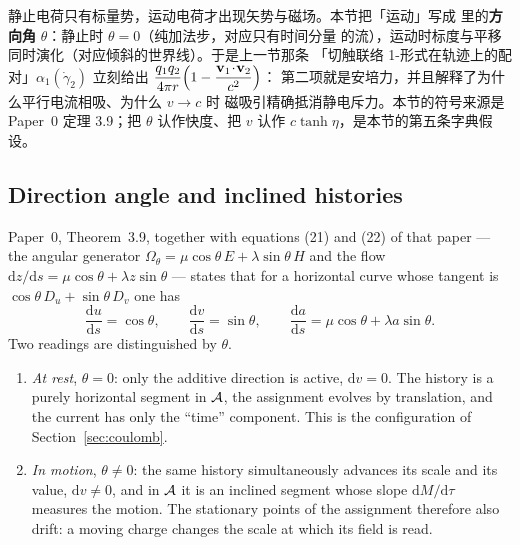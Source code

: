 
\begin{cnread}
静止电荷只有标量势，运动电荷才出现矢势与磁场。本节把「运动」写成 \AEG{}
里的\textbf{方向角} $\theta$：静止时 $\theta=0$（纯加法步，对应只有时间分量
的流），运动时标度与平移同时演化（对应倾斜的世界线）。于是上一节那条
「切触联络 1-形式在轨迹上的配对」$\alpha_1(\dot\gamma_2)$ 立刻给出
$\dfrac{q_1q_2}{4\pi r}\Bigl(1-\dfrac{\mathbf v_1\!\cdot\!\mathbf v_2}{c^2}\Bigr)$：
第二项就是安培力，并且解释了为什么平行电流相吸、为什么 $v\to c$ 时
磁吸引精确抵消静电斥力。本节的符号来源是 Paper~0 定理 3.9；把 $\theta$
认作快度、把 $v$ 认作 $c\tanh\eta$，是本节的第五条字典假设。
\end{cnread}

\subsection{Direction angle and inclined histories}

Paper~0, Theorem~3.9, together with equations (21) and (22) of that paper ---
the angular generator $\Omega_\theta=\mu\cos\theta\,E+\lambda\sin\theta\,H$ and
the flow $\mathrm dz/\mathrm ds=\mu\cos\theta+\lambda z\sin\theta$ --- states
that for a horizontal curve whose tangent is
$\cos\theta\,D_u+\sin\theta\,D_v$ one has
\begin{equation}\label{eq:theta-flow}
  \frac{\mathrm du}{\mathrm ds}=\cos\theta,
  \qquad
  \frac{\mathrm dv}{\mathrm ds}=\sin\theta,
  \qquad
  \frac{\mathrm da}{\mathrm ds}
  =\mu\cos\theta+\lambda a\sin\theta .
\end{equation}
Two readings are distinguished by $\theta$.

\begin{enumerate}[label=(\roman*)]
  \item \emph{At rest}, $\theta=0$: only the additive direction is active,
  $\mathrm dv=0$.  The history is a purely horizontal segment in $\mathcal{A}$, the
  assignment evolves by translation, and the current has only the ``time''
  component.  This is the configuration of Section~\ref{sec:coulomb}.
  \item \emph{In motion}, $\theta\ne0$: the same history simultaneously advances
  its scale and its value, $\mathrm dv\ne0$, and in $\mathcal{A}$ it is an inclined
  segment whose slope $\mathrm dM/\mathrm d\tau$ measures the motion.  The
  stationary points of the assignment therefore also drift: a moving charge
  changes the scale at which its field is read.
\end{enumerate}

